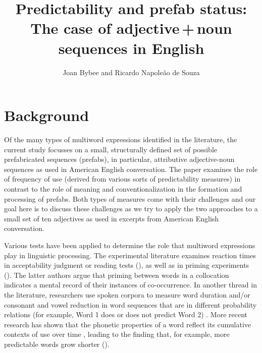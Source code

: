 \documentclass[output=paper]{langscibook}
\author{Joan Bybee\affiliation{University of New Mexico} and Ricardo Napoleão de Souza\affiliation{University of Helsinki}}
\title[Predictability and prefab status: The case of adjective\,+\,noun sequences]{Predictability and prefab status: The case of adjective\,+\,noun sequences in English}
\begin{document}
\maketitle 

\section{Background}

Of the many types of multiword expressions identified in the literature, the current study focusses on a small, structurally defined set of possible prefabricated sequences (prefabs), in particular, attributive adjective-noun sequences as used in American English conversation. The paper examines the role of frequency of use (derived from various sorts of predictability measures) in contrast to the role of meaning and conventionalization in the formation and processing of prefabs. Both types of measures come with their challenges and our goal here is to discuss these challenges as we try to apply the two approaches to a small set of ten adjectives as used in excerpts from American English conversation. 

Various tests have been applied to determine the role that multiword expressions play in linguistic processing. The experimental literature examines reaction times in acceptability judgment or reading tests (\citealt{EllisEtAl2008,GyllstadWolter2014,WolterYamashita2018}), as well as in priming experiments (\citealt{DurrantDoherty2010}). The latter authors argue that priming between words in a collocation indicates a mental record of their instances of co-occurrence. In another thread in the literature, researchers use spoken corpora to measure word duration and\slash or consonant and vowel reduction in word sequences that are in different probability relations (for example, Word 1 does or does not predict Word 2) \citep{BellJurafsky2009}. More recent research has shown that the phonetic properties of a word reflect its cumulative contexts of use over time \citep{Seyfarth2014}, leading to the finding that, for example, more predictable words grow shorter (\citealt{SóskuthyHay2017}).
\end{document}
